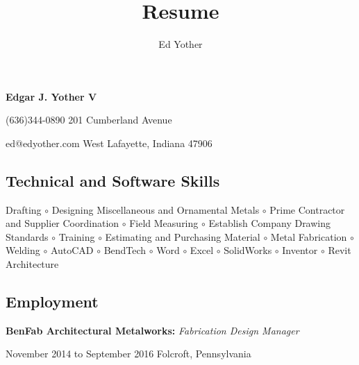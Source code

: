 \documentclass[12pt]{extarticle}
\title{Resume}
\author{Ed Yother}
\begin{document}
\begin{center}
    \textbf{Edgar J. Yother V}
\end{center}
(636)344-0890 \hfill 201 Cumberland Avenue 

ed@edyother.com \hfill West Lafayette, Indiana 47906 


\subsection*{Technical and Software Skills}
Drafting $\circ$ Designing Miscellaneous and Ornamental Metals $\circ$ Prime Contractor and Supplier Coordination $\circ$ Field Measuring $\circ$ Establish Company Drawing Standards $\circ$ Training $\circ$ Estimating and Purchasing Material $\circ$ Metal Fabrication $\circ$ Welding $\circ$ AutoCAD $\circ$ BendTech $\circ$ Word $\circ$ Excel $\circ$ SolidWorks $\circ$ Inventor $\circ$ Revit Architecture
\subsection*{Employment}
\textbf{BenFab Architectural Metalworks:} \hfill \textit{Fabrication Design Manager}

November 2014 to September 2016 \hfill Folcroft, Pennsylvania
\end{document}

